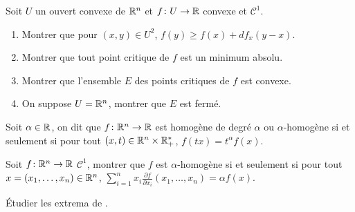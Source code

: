 \documentclass[12pt]{article}
\begin{document}
\begin{exercise}
	Soit $U$ un ouvert convexe de $\mathbb{R}^{n}$ et $f\colon U\to\mathbb{R}$ convexe et $\mathcal{C}^{1}$.
	\begin{enumerate}
		\item Montrer que pour $(x,y)\in U^{2}$, $f(y)\geqslant f(x)+df_{x}(y-x)$.
		\item Montrer que tout point critique de $f$ est un minimum absolu.
		\item Montrer que l'ensemble $E$ des points critiques de $f$ est convexe.
		\item On suppose $U=\mathbb{R}^{n}$, montrer que $E$ est fermé.
	\end{enumerate}
\end{exercise}

\begin{exercise}
	Soit $\alpha\in\mathbb{R}$, on dit que $f\colon\mathbb{R}^{n}\to\mathbb{R}$ est homogène de degré $\alpha$ ou $\alpha$-homogène si et seulement si pour tout $(x,t)\in\mathbb{R}^{n}\times\mathbb{R}_{+}^{*}$, $f(tx)=t^{\alpha}f(x)$.

	Soit $f\colon\mathbb{R}^{n}\to\mathbb{R}$ $\mathcal{C}^{1}$, montrer que $f$ est $\alpha$-homogène si et seulement si pour tout $x=(x_1,\dots,x_n)\in\mathbb{R}^{n}$, $\sum_{i=1}^{n}x_i\frac{\partial f}{\partial x_i}(x_1,\dots,x_n)=\alpha f(x)$.
\end{exercise}

\begin{exercise}
	Étudier les extrema de .
\end{exercise}
\end{document}
